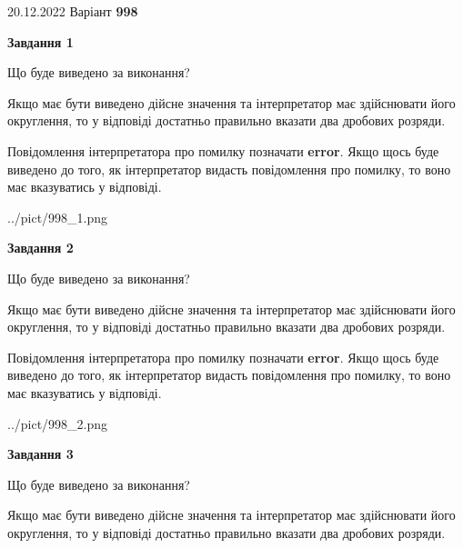 \documentclass[12pt, ukrainian]{article}
\begin{document}
{20.12.2022 Варіант \No \textbf { 998 }\par}
{
\begin {Large}

{\begin {center}\textbf{Завдання 1}\end {center}}\par
Що буде виведено за виконання? \par

Якщо має бути виведено дійсне значення та інтерпретатор має здійснювати його округлення, 
то у відповіді достатньо правильно вказати два дробових розряди.

Повідомлення інтерпретатора про помилку позначати \textbf{error}.
Якщо щось буде виведено до того, як інтерпретатор видасть повідомлення про помилку, 
то воно має вказуватись у відповіді. \par

\begin{center}
	{../pict/998_1.png}
\end{center}
\newpage

{\begin {center}\textbf{Завдання 2}\end {center}}\par
Що буде виведено за виконання? \par

Якщо має бути виведено дійсне значення та інтерпретатор має здійснювати його округлення, 
то у відповіді достатньо правильно вказати два дробових розряди.

Повідомлення інтерпретатора про помилку позначати \textbf{error}.
Якщо щось буде виведено до того, як інтерпретатор видасть повідомлення про помилку, 
то воно має вказуватись у відповіді. \par

\begin{center}
	{../pict/998_2.png}
\end{center}
\newpage

{\begin {center}\textbf{Завдання 3}\end {center}}\par
Що буде виведено за виконання? \par

Якщо має бути виведено дійсне значення та інтерпретатор має здійснювати його округлення, 
то у відповіді достатньо правильно вказати два дробових розряди.


\end{Large}}
\end{document}
